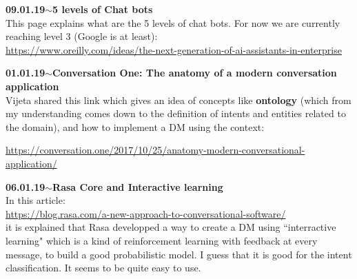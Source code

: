 \documentclass[11pt,a4paper]{article}
\newenvironment{loggentry}[2]%
{\noindent\textbf{#1}\hspace{1cm}$\mathbf{\sim}$\text{ }\textbf{#2}\\}{\vspace{0.5cm}}
\begin{document}
\begin{loggentry}{09.01.19}{5 levels of Chat bots}

This page explains what are the 5 levels of chat bots. For now we are currently reaching level 3 (Google is at least):\\
\url{https://www.oreilly.com/ideas/the-next-generation-of-ai-assistants-in-enterprise}\\

\end{loggentry}

\begin{loggentry}{01.01.19}{Conversation One: The anatomy of a modern conversation application}

Vijeta shared this link which gives an idea of concepts like \textbf{ontology} (which from my understanding comes down to the definition of intents and entities related to the domain), and how to implement a DM using the context:

\url{https://conversation.one/2017/10/25/anatomy-modern-conversational-application/}

\end{loggentry}


\begin{loggentry}{06.01.19}{Rasa Core and Interactive learning}

In this article:\\
\url{https://blog.rasa.com/a-new-approach-to-conversational-software/}\\
it is explained that Rasa developped a way to create a DM using ``interractive learning" which is a kind of reinforcement learning with feedback at every message, to build a good probabilistic model. I guess that it is good for the intent classification. It seems to be quite easy to use.

\end{loggentry}
\end{document}
